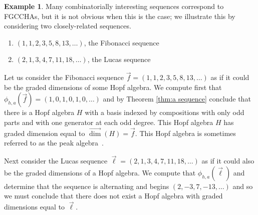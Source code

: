 \documentclass[11pt]{amsart}
\theoremstyle{definition}
\newtheorem{example}[theorem]{Example}
\numberwithin{equation}{section}
\newcommand{\FGCCHAs}{\textsf{FGCCHA}s\xspace}
\newcommand{\vecdim}{\overrightarrow{\dim}}
\newcommand{\felix}[1]{\todo[size=\tiny,color=Cyan]{#1 \\ \hfill --- Félix}}
\begin{document}

\begin{example}
Many combinatorially interesting sequences correspond to \FGCCHAs, but it is not obvious when this is the case; we illustrate this by considering two closely-related sequences.
\begin{enumerate}
\item $(1,1,2,3,5,8,13,\ldots)$, the Fibonacci sequence

\item $(2,1,3,4,7,11,18,\ldots)$, the Lucas sequence
\end{enumerate}
Let us consider the Fibonacci sequence $\vec{f} = (1,1,2,3,5,8,13,\ldots)$
as if it could be the graded dimensions of some Hopf algebra.
We compute first that $\phi_{h,a}(\vec{f}) = (1,0,1,0,1,0,\ldots)$
and by Theorem \ref{thm:a sequence} conclude
that there is a Hopf algebra $H$ with a basis indexed by
compositions with only odd parts and with one generator at each odd degree.
This Hopf algebra $H$ has graded dimension equal to $\vecdim(H) = \vec{f}$.
This Hopf algebra is sometimes referred to as the peak algebra~\cite[\S 2]{Bergeron_2002}.

Next consider the Lucas sequence $\vec{\ell} = (2,1,3,4,7,11,18,\ldots)$
as if it could also be the graded dimensions of a Hopf algebra.  We compute that $\phi_{h,a}(\vec{\ell})$ and determine
that the sequence is alternating and begins $(2, -3, 7, -13,\ldots)$ and so we must conclude
that there does not exist a Hopf algebra with graded dimensions equal to $\vec{\ell}$.
\end{example}
\end{document}
